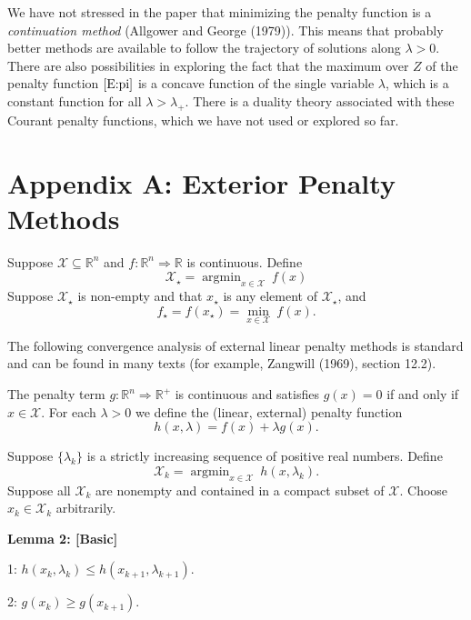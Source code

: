 \documentclass[
  12pt,
]{article}
\begin{document}
We have not stressed in the paper that minimizing the penalty function
is a \emph{continuation method} (Allgower and George (1979)). This means
that probably better methods are available to follow the trajectory of
solutions along \(\lambda>0\). There are also possibilities in exploring
the fact that the maximum over \(Z\) of the penalty function
\(\eqref{E:pi}\) is a concave function of the single variable
\(\lambda\), which is a constant function for all \(\lambda>\lambda_+\).
There is a duality theory associated with these Courant penalty
functions, which we have not used or explored so far.

\hypertarget{appendix-a-exterior-penalty-methods}{%
\section{Appendix A: Exterior Penalty
Methods}\label{appendix-a-exterior-penalty-methods}}

Suppose \(\mathcal{X}\subseteq\mathbb{R}^n\) and
\(f:\mathbb{R}^n\Rightarrow\mathbb{R}\) is continuous. Define \[
\mathcal{X}_\star=\mathop{\text{argmin}}_{x\in\mathcal{X}}\ f(x)
\] Suppose \(\mathcal{X}_\star\) is non-empty and that \(x_\star\) is
any element of \(\mathcal{X}_\star\), and \[
f_\star=f(x_\star)=\min_{x\in\mathcal{X}}\ f(x).
\]

The following convergence analysis of external linear penalty methods is
standard and can be found in many texts (for example, Zangwill (1969),
section 12.2).

The penalty term \(g:\mathbb{R}^n\Rightarrow\mathbb{R}^+\) is continuous
and satisfies \(g(x)=0\) if and only if \(x\in\mathcal{X}\). For each
\(\lambda>0\) we define the (linear, external) penalty function
\begin{equation}
h(x,\lambda)=f(x)+\lambda g(x).
\end{equation}

Suppose \(\{\lambda_k\}\) is a strictly increasing sequence of positive
real numbers. Define \begin{equation}
\mathcal{X}_k=\mathop{\text{argmin}}_{x\in\mathcal{X}}\ h(x,\lambda_k).
\end{equation} Suppose all \(\mathcal{X}_k\) are nonempty and contained
in a compact subset of \(\mathcal{X}\). Choose \(x_k\in\mathcal{X}_k\)
arbitrarily.

\textbf{Lemma 2: {[}Basic{]}}

1: \(h(x_k,\lambda_k)\leq h(x_{k+1},\lambda_{k+1})\).

2: \(g(x_k)\geq g(x_{k+1})\).
\end{document}

